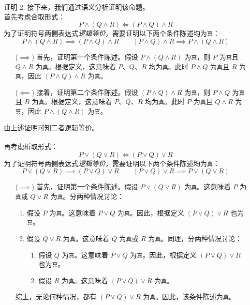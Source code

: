\begin{proofs}{证明 2. }
    接下来，我们通过语义分析证明该命题。\\
    首先考虑合取形式：
    \[P \land (Q \land R) \iff (P \land Q) \land R\]
    为了证明符号两侧表达式\emph{逻辑等价}，需要证明以下两个条件陈述均为\verb|真|：
    \[P \land (Q \land R) \implies (P \land Q) \land R \qquad (P \land Q) \land R \implies P \land (Q \land R)\]
    \begin{itemize}
        \item[($\implies$)] 首先，证明第一个条件陈述。假设 $P \land (Q \land R)$ 为\verb|真|，则 $P$ 为\verb|真|且 $Q \land R$ 为\verb|真|。根据定义，这意味着 $P$、$Q$、$R$ 均为\verb|真|。此时 $P \land Q$ 为\verb|真|且 $R$ 为\verb|真|，因此 $(P \land Q) \land R$ 为\verb|真|。
        \item[($\impliedby$)] 接着，证明第二个条件陈述。假设 $(P \land Q) \land R$ 为\verb|真|，则 $P \land Q$ 为\verb|真|且 $R$ 为\verb|真|。根据定义，这意味着 $P$、$Q$、$R$ 均为\verb|真|。此时 $P$ 为\verb|真|且 $Q \land R$ 为\verb|真|，因此 $P \land (Q \land R)$ 为\verb|真|。
    \end{itemize}
    由上述证明可知二者逻辑等价。\\ \\
    再考虑析取形式：
    \[P \lor (Q \lor R) \iff (P \lor Q) \lor R\]
    为了证明符号两侧表达式\emph{逻辑等价}，需要证明以下两个条件陈述均为\verb|真|：
    \[P \lor (Q \lor R) \implies (P \lor Q) \lor R \qquad (P \lor Q) \lor R \implies P \lor (Q \lor R)\]
    \begin{itemize}
        \item[($\implies$)] 首先，证明第一个条件陈述。假设 $P \lor (Q \lor R)$ 为\verb|真|。这意味着 $P$ 为\verb|真|或 $Q \lor R$ 为\verb|真|。分两种情况讨论：
        \begin{enumerate}
            \item 假设 $P$ 为\verb|真|。这意味着 $P \lor Q$ 为\verb|真|。因此，根据定义 $(P \lor Q) \lor R$ 也为\verb|真|。
            \item 假设 $Q \lor R$ 为\verb|真|。这意味着 $Q$ 为\verb|真|或 $R$ 为\verb|真|。同理，分两种情况讨论：
            \begin{enumerate}[label=(\alph*)]
                \item 假设 $Q$ 为\verb|真|。这意味着 $P \lor Q$ 为\verb|真|。因此，根据定义 $(P \lor Q) \lor R$ 也为\verb|真|。
                \item 假设 $R$ 为\verb|真|。这意味着 $(P \lor Q) \lor R$ 为\verb|真|。
            \end{enumerate}
        \end{enumerate} 
        综上，无论何种情况，都有 $(P \lor Q) \lor R$ 为\verb|真|。因此，该条件陈述为\verb|真|。


\end{itemize}
\end{proofs}
